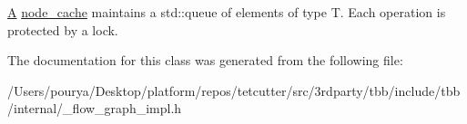 \hyperlink{structA}{A} \hyperlink{classinternal_1_1node__cache}{node\+\_\+cache} maintains a std\+::queue of elements of type T. Each operation is protected by a lock. 

The documentation for this class was generated from the following file\+:\begin{DoxyCompactItemize}
\item 
/\+Users/pourya/\+Desktop/platform/repos/tetcutter/src/3rdparty/tbb/include/tbb/internal/\+\_\+flow\+\_\+graph\+\_\+impl.\+h\end{DoxyCompactItemize}
